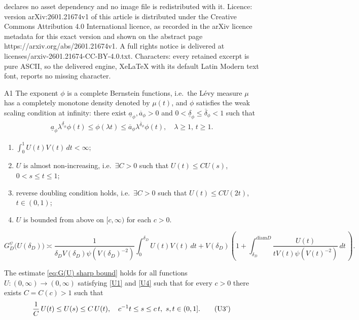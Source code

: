 \documentclass[10pt,a4paper]{amsart}
\newcommand{\GDP}{G_D^\psi}
\newcommand{\de}{\delta_D}
\newcommand{\diam}{\textrm{diam}}
\newcommand{\oa}[1]{\overline{a}_{#1}}
\newcommand{\od}[1]{\overline{\delta}_{#1}}
\newcommand{\ua}[1]{\underline{a}_{#1}}
\newcommand{\ud}[1]{\underline{\delta}_{#1}}
\begin{document}
declares no asset dependency and no image file is redistributed with it. Licence: version arXiv:2601.21674v1 of this article is distributed under the Creative Commons Attribution 4.0 International licence, as recorded in the arXiv licence metadata for this exact version and shown on the abstract page https://arxiv.org/abs/2601.21674v1. A full rights notice is delivered at licenses/arxiv-2601.21674-CC-BY-4.0.txt. Characters: every retained excerpt is pure ASCII, so the delivered engine, XeLaTeX with its default Latin Modern text font, reports no missing character.
    \begin{assumption}{A}{1}\label{as:WSC}
        The exponent $\phi$ is a complete Bernstein functions, i.e.~the L\'evy measure $\mu$ has a completely monotone density denoted by $\mu(t)$, and $\phi$ satisfies the weak scaling condition at infinity: there exist $\ua{\phi},\oa{\phi}>0$ and $0< \ud{\phi}\le \od{\phi}<1$ such that
        \begin{align}\label{eq:WSC}
            \ua{\phi} \lambda^{\ud{\phi}} \phi(t)\le \phi(\lambda t)\le \oa{\phi}
            \lambda^{\od{\phi}}\phi(t),\quad \lambda\ge 1, \, t\ge 1.
        \end{align}
    \end{assumption}

		\begin{enumerate}[label=(\textbf{U\arabic*})]
			\item \label{U1}  
			$\int_{0}^1U(t)V(t)\, dt <\infty$;
			
			\item \label{U2} $U$ is almost non-increasing, i.e.~$\exists C>0$ such that $U(t)\le C U(s)$, $0<s\le t\le 1$;
			
			
			\item \label{U3} reverse doubling condition holds, i.e.~$\exists C>0$  
			such that $U(t)\le C U(2t)$, $t\in (0,1)$; 
			\item \label{U4} $U$ is bounded from
			above on $[c, \infty)$ for each $c >0$.
		\end{enumerate}

		\begin{equation}\label{eq:G(U) sharp bound}
    			\GDP\big(U(\de)\big)\asymp
    			\frac{1}{\de V(\de)\psi(V(\de)^{-2})}\int_0^{\de}U(t)V(t)\, dt+
    			V(\de)\left(1+\int_{\de}^{\diam D}
    			\frac{U(t)}{t V(t)\psi(V(t)^{-2})}\, dt\,\right).  
		\end{equation}

    \begin{cor}\label{c:bndry-G(U)-decay}
     The estimate \eqref{eq:G(U) sharp bound} holds for all functions $U:(0,\infty)\to(0,\infty)$ satisfying \ref{U1} and \ref{U4} such that for every $c>0$ there exists $C=C(c)>1$ such that 
        \begin{align}\label{eq: U3'}
            \frac{1}{C}\, U(t)\le U(s)\le C\, U(t),\quad   {c}^{-1} t \le s \le c\,t, \ s,t\in (0,1].  \tag{\textbf{U3'}}
        \end{align}
    \end{cor}
\end{document}
